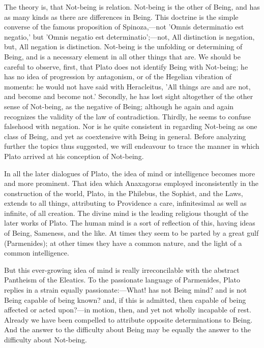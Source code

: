 \documentclass[11pt,letter]{article}
\begin{document}
\par  The theory is, that Not-being is relation. Not-being is the other of Being, and has as many kinds as there are differences in Being. This doctrine is the simple converse of the famous proposition of Spinoza,—not 'Omnis determinatio est negatio,' but 'Omnis negatio est determinatio';—not, All distinction is negation, but, All negation is distinction. Not-being is the unfolding or determining of Being, and is a necessary element in all other things that are. We should be careful to observe, first, that Plato does not identify Being with Not-being; he has no idea of progression by antagonism, or of the Hegelian vibration of moments: he would not have said with Heracleitus, 'All things are and are not, and become and become not.' Secondly, he has lost sight altogether of the other sense of Not-being, as the negative of Being; although he again and again recognizes the validity of the law of contradiction. Thirdly, he seems to confuse falsehood with negation. Nor is he quite consistent in regarding Not-being as one class of Being, and yet as coextensive with Being in general. Before analyzing further the topics thus suggested, we will endeavour to trace the manner in which Plato arrived at his conception of Not-being.

\par  In all the later dialogues of Plato, the idea of mind or intelligence becomes more and more prominent. That idea which Anaxagoras employed inconsistently in the construction of the world, Plato, in the Philebus, the Sophist, and the Laws, extends to all things, attributing to Providence a care, infinitesimal as well as infinite, of all creation. The divine mind is the leading religious thought of the later works of Plato. The human mind is a sort of reflection of this, having ideas of Being, Sameness, and the like. At times they seem to be parted by a great gulf (Parmenides); at other times they have a common nature, and the light of a common intelligence.

\par  But this ever-growing idea of mind is really irreconcilable with the abstract Pantheism of the Eleatics. To the passionate language of Parmenides, Plato replies in a strain equally passionate:—What! has not Being mind? and is not Being capable of being known? and, if this is admitted, then capable of being affected or acted upon?—in motion, then, and yet not wholly incapable of rest. Already we have been compelled to attribute opposite determinations to Being. And the answer to the difficulty about Being may be equally the answer to the difficulty about Not-being.
\end{document}
